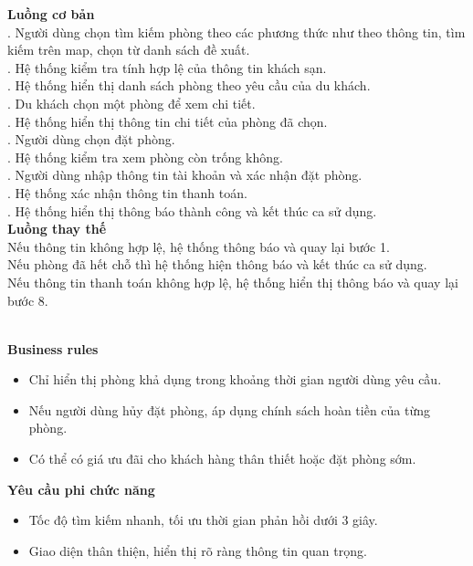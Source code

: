 \begin{small}
\textbf{Luồng cơ bản}\\
. Người dùng chọn tìm kiếm phòng theo các phương thức như theo thông tin, tìm kiếm trên map, chọn từ danh sách đề xuất.\\
. Hệ thống kiểm tra tính hợp lệ của thông tin khách sạn.\\
. Hệ thống hiển thị danh sách phòng theo yêu cầu của du khách.\\
. Du khách chọn một phòng để xem chi tiết.\\
. Hệ thống hiển thị thông tin chi tiết của phòng đã chọn.\\
. Người dùng chọn đặt phòng.\\
. Hệ thống kiểm tra xem phòng còn trống không.\\
. Người dùng nhập thông tin tài khoản và xác nhận đặt phòng.\\
. Hệ thống xác nhận thông tin thanh toán.\\
. Hệ thống hiển thị thông báo thành công và kết thúc ca sử dụng.\\

\textbf{Luồng thay thế}\\
 Nếu thông tin không hợp lệ, hệ thống thông báo và quay lại bước 1.\\
 Nếu phòng đã hết chỗ thì hệ thống hiện thông báo và kết thúc ca sử dụng.\\
 Nếu thông tin thanh toán không hợp lệ, hệ thống hiển thị thông báo và quay lại bước 8.\\
\end{small}\\
\textbf{\indent Business rules}
\begin{itemize}
    \item Chỉ hiển thị phòng khả dụng trong khoảng thời gian người dùng yêu cầu.
    \item Nếu người dùng hủy đặt phòng, áp dụng chính sách hoàn tiền của từng phòng.
    \item Có thể có giá ưu đãi cho khách hàng thân thiết hoặc đặt phòng sớm.
\end{itemize}

\textbf{Yêu cầu phi chức năng}
\begin{itemize}
    \item Tốc độ tìm kiếm nhanh, tối ưu thời gian phản hồi dưới 3 giây.
    \item Giao diện thân thiện, hiển thị rõ ràng thông tin quan trọng.
\end{itemize}

